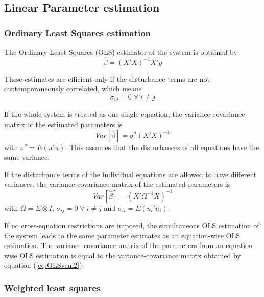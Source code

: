 \documentclass[article]{jss}
\begin{document}
\subsection{Linear Parameter estimation}

\subsubsection{Ordinary Least Squares estimation}

The Ordinary Least Squares (OLS) estimator of the system 
is obtained by
\begin{equation}
   \widehat{\beta} = \left( X'X \right)^{-1} X'y
\end{equation}

These estimates are efficient only if the disturbance terms are not 
contemporaneously correlated, which means 
\begin{equation}
   \sigma_{ij} = 0 \; \forall \; i \neq j
\end{equation}

If the whole system is treated as one single equation, 
the variance-covariance matrix of the estimated parameters is
\begin{equation}
   Var \left[ \widehat{\beta} \right] = \sigma^2 \left( X'X \right)^{-1}
\end{equation}
with $\sigma^2 = E \left( u' u \right)$.
This assumes that the disturbances of all equations have the
same variance.

If the disturbance terms of the individual equations 
are allowed to have different variances, 
the variance-covariance matrix of the estimated parameters is
\begin{equation}
   Var \left[ \widehat{\beta} \right] = \left( X' \Omega^{-1} X \right)^{-1}
   \label{eq:OLSvcm2}
\end{equation}
with $\Omega = \Sigma \otimes I$, 
$\sigma_{ij} = 0 \; \forall \; i \neq j$ and
$\sigma_{ii} = E \left( u_i' u_i \right)$.

If no cross-equation restrictions are imposed, the simultaneous 
OLS estimation of the system leads to the same parameter estimates 
as an equation-wise OLS estimation. The variance-covariance matrix 
of the parameters from an equation-wise OLS estimation is equal to 
the variance-covariance matrix obtained by equation 
(\ref{eq:OLSvcm2}).


\subsubsection{Weighted least squares}
\end{document}
